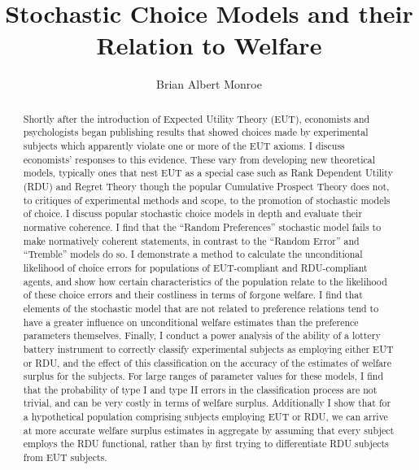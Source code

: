 \documentclass[11pt,a4paper,notitlepage]{report}
\title{Stochastic Choice Models and their Relation to Welfare}
\author{Brian Albert Monroe}
\begin{document}

\doublespacing

\begin{abstract}

Shortly after the introduction of Expected Utility Theory (EUT), economists and psychologists began publishing results that showed choices made by experimental subjects which apparently violate one or more of the EUT axioms.
I discuss economists' responses to this evidence.
These vary from developing new theoretical models, typically ones that nest EUT as a special case such as Rank Dependent Utility (RDU) and Regret Theory though the popular Cumulative Prospect Theory does not, to critiques of experimental methods and scope, to the promotion of stochastic models of choice.
I discuss popular stochastic choice models in depth and evaluate their normative coherence.
I find that the \enquote{Random Preferences} stochastic model fails to make normatively coherent statements, in contrast to the \enquote{Random Error} and \enquote{Tremble} models do so.
I demonstrate a method to calculate the unconditional likelihood of choice errors for populations of EUT-compliant and RDU-compliant agents, and show how certain characteristics of the population relate to the likelihood of these choice errors and their costliness in terms of forgone welfare.
I find that elements of the stochastic model that are not related to preference relations tend to have a greater influence on unconditional welfare estimates than the preference parameters themselves.
Finally, I conduct a power analysis of the ability of a lottery battery instrument to correctly classify experimental subjects as employing either EUT or RDU, and the effect of this classification on the accuracy of the estimates of welfare surplus for the subjects.
For large ranges of parameter values for these models, I find that the probability of type I and type II errors in the classification process are not trivial, and can be very costly in terms of welfare surplus.
Additionally I show that for a hypothetical population comprising subjects employing EUT or RDU, we can arrive at more accurate welfare surplus estimates in aggregate by assuming that every subject employs the RDU functional, rather than by first trying to differentiate RDU subjects from EUT subjects.

\end{abstract}
\end{document}
